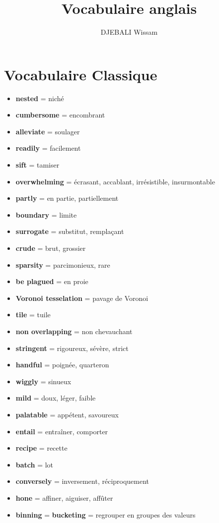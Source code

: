 \documentclass[french]{article}
\title{Vocabulaire anglais}
\author{DJEBALI Wissam}
\begin{document}
	\maketitle


\section{Vocabulaire Classique}
\begin{itemize}[label=\textbullet]
	\item \textbf{nested} = niché
	\item \textbf{cumbersome} = encombrant 
	\item \textbf{alleviate} = soulager
	\item \textbf{readily} = facilement
	\item \textbf{sift} = tamiser
	\item \textbf{overwhelming} = écrasant, accablant, irrésistible, insurmontable
	\item \textbf{partly} = en partie, partiellement
	\item \textbf{boundary} = limite
	\item \textbf{surrogate} = substitut, remplaçant
	\item \textbf{crude} = brut, grossier
	\item \textbf{sparsity} = parcimonieux, rare
	\item \textbf{be plagued} = en proie
	\item \textbf{Voronoi tesselation} = pavage de Voronoi
	\item \textbf{tile} = tuile
	\item \textbf{non overlapping} = non chevauchant
	\item \textbf{stringent} = rigoureux, sévère, strict
	\item \textbf{handful} = poignée, quarteron
	\item \textbf{wiggly} = sinueux
	\item \textbf{mild} = doux, léger, faible
	\item \textbf{palatable} = appétent, savoureux
	\item \textbf{entail} = entraîner, comporter
	\item \textbf{recipe} = recette
	\item \textbf{batch} = lot
	\item \textbf{conversely} = inversement, réciproquement
	\item \textbf{hone} = affiner, aiguiser, affûter
	\item \textbf{binning} = \textbf{bucketing} = regrouper en groupes des valeurs

\end{itemize}
\end{document}
